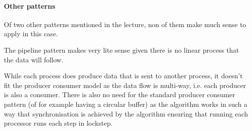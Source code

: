 \documentclass[11pt,a4paper]{article}
\begin{document}
\paragraph{Other patterns}
Of two other patterns mentioned in the lecture, non of them make much sense to apply in this case.  

The pipeline pattern makes very lite sense given there is no linear process that the data will follow.

While each process does produce data that is sent to another process, it doesn't fit the producer consumer model as the data flow is multi-way, i.e. each producer is also a consumer. There is also no need for the standard producer consumer pattern (of for example having a circular buffer) as the algorithm works in such a way that synchronisation is achieved by the algorithm ensuring that running each processor runs each step in lockstep.
\end{document}
